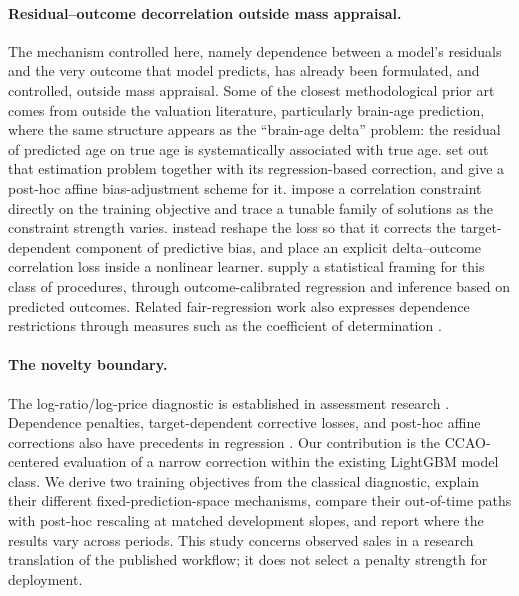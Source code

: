 \documentclass[10pt]{article}
\theoremstyle{definition}
\newcommand{\1}{\mathbf{1}}
\begin{document}
\paragraph{Residual--outcome decorrelation outside mass appraisal.}
The mechanism controlled here, namely dependence between a model's residuals and the
very outcome that model predicts, has already been formulated, and controlled, outside
mass appraisal. Some of the closest methodological prior art comes from outside the
valuation literature, particularly brain-age prediction, where the same structure appears
as the ``brain-age delta'' problem: the residual of predicted age on true age is
systematically associated with true age.
\textcite{SmithEtAl2019} set out that estimation problem together with its
regression-based correction, and \textcite{BeheshtiEtAl2019} give a post-hoc affine
bias-adjustment scheme for it. \textcite{TrederEtAl2021} impose a correlation constraint
directly on the training objective and trace a tunable family of solutions as the
constraint strength varies. \textcite{WangEtAl2023} instead reshape the loss so that it
corrects the target-dependent component of predictive bias, and \textcite{RenEtAl2026}
place an explicit delta--outcome correlation loss inside a nonlinear learner.
\textcite{LeeChen2026} supply a statistical framing for this class of procedures, through
outcome-calibrated regression and inference based on predicted outcomes. Related
fair-regression work also expresses dependence restrictions through measures such as the
coefficient of determination \cite{KomiyamaEtAl2018}.

\paragraph{The novelty boundary.}
The log-ratio/log-price diagnostic is established in assessment research
\cite{Cheng1974}. Dependence penalties, target-dependent corrective losses, and
post-hoc affine corrections also have precedents in regression
\cite{KomiyamaEtAl2018,TrederEtAl2021,SmithEtAl2019,WangEtAl2023,RenEtAl2026,BeheshtiEtAl2019,LeeChen2026}.
Our contribution is the CCAO-centered evaluation of a narrow correction within
the existing LightGBM model class. We derive two training objectives from the
classical diagnostic, explain their different fixed-prediction-space mechanisms,
compare their out-of-time paths with post-hoc rescaling at matched development
slopes, and report where the results vary across periods. This study concerns
observed sales in a research translation of the published workflow; it does not
select a penalty strength for deployment.
\end{document}
